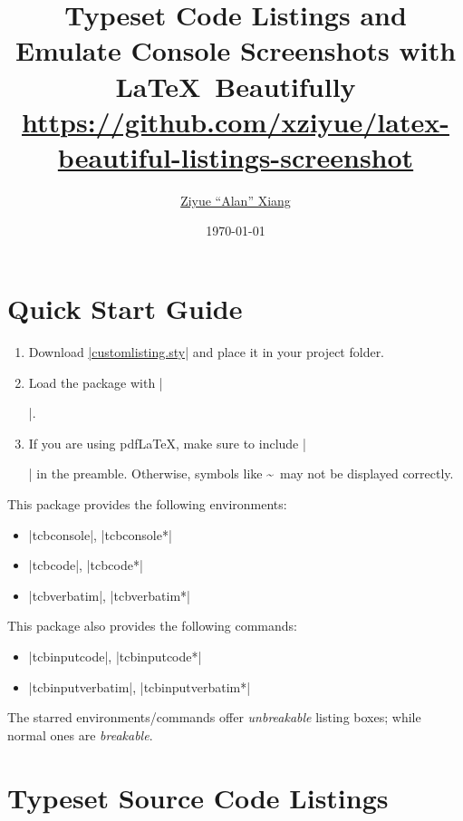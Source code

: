 \documentclass[letterpaper, 11pt, DIV=11]{scrartcl}
\author{\href{https://www.alanshawn.com}{Ziyue ``Alan'' Xiang}}
\title{Typeset Code Listings and Emulate Console Screenshots with \LaTeX\  Beautifully\\ {\small \url{https://github.com/xziyue/latex-beautiful-listings-screenshot}}}
\date{\today}
\begin{document}

\maketitle

\tableofcontents

\clearpage



\section{Quick Start Guide}

\begin{enumerate}
\item Download \href{https://github.com/xziyue/latex-beautiful-listings-screenshot/blob/master/customlisting.sty}{\rawinline|customlisting.sty|} and place it in your project folder.
\item Load the package with \texinline|\usepackage{customlisting}|.
\item If you are using pdf\LaTeX, make sure to include \texinline|\usepackage[T1]{fontenc}| in the preamble. Otherwise, symbols like \textasciitilde\ may not be displayed correctly.
\end{enumerate}

This package provides the following environments:
\begin{itemize}
\item \rawinline|tcbconsole|, \rawinline|tcbconsole*|
\item \rawinline|tcbcode|, \rawinline|tcbcode*|
\item \rawinline|tcbverbatim|, \rawinline|tcbverbatim*|
\end{itemize}

This package also provides the following commands:
\begin{itemize}
\item \rawinline|tcbinputcode|, \rawinline|tcbinputcode*|
\item \rawinline|tcbinputverbatim|, \rawinline|tcbinputverbatim*|
\end{itemize}

The starred environments/commands offer \emph{unbreakable} listing boxes; while normal ones are \emph{breakable}.



\section{Typeset Source Code Listings}
\end{document}
